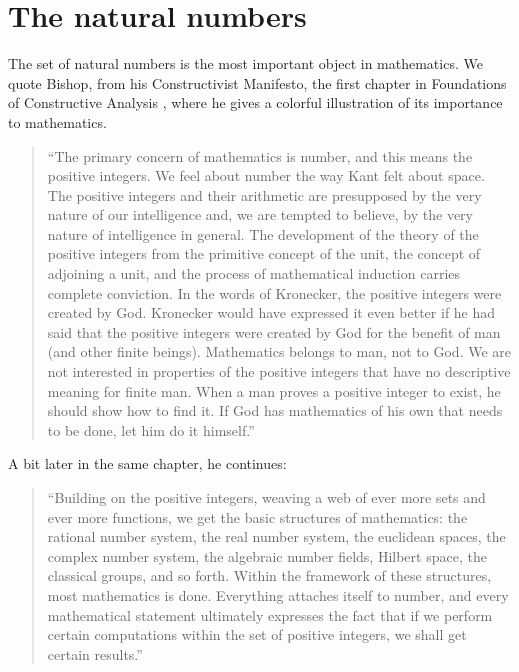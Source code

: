 \section{The natural numbers}
\label{sec:nat}


The set of natural numbers is the most important object in mathematics. We quote Bishop, from his Constructivist Manifesto, the first chapter in Foundations of Constructive Analysis \cite{Bishop1967}, where he gives a colorful illustration of its importance to mathematics.

\begin{quote}
  ``The primary concern of mathematics is number, and this means the positive integers. We feel about number the way Kant felt about space. The positive integers and their arithmetic are presupposed by the very nature of our intelligence and, we are tempted to believe, by the very nature of intelligence in general. The development of the theory of the positive integers from the primitive concept of the unit, the concept of adjoining a unit, and the process of mathematical induction carries complete conviction. In the words of Kronecker, the positive integers were created by God. Kronecker would have expressed it even better if he had said that the positive integers were created by God for the benefit of man (and other finite beings). Mathematics belongs to man, not to God. We are not interested in properties of the positive integers that have no descriptive meaning for finite man. When a man proves a positive integer to exist, he should show how to find it. If God has mathematics of his own that needs to be done, let him do it himself.''
\end{quote}

A bit later in the same chapter, he continues:

\begin{quote}
  ``Building on the positive integers, weaving a web of ever more sets and ever more functions, we get the basic structures of mathematics: the rational number system, the real number system, the euclidean spaces, the complex number system, the algebraic number fields, Hilbert space, the classical groups, and so forth. Within the framework of these structures, most mathematics is done. Everything attaches itself to number, and every mathematical statement ultimately expresses the fact that if we perform certain computations within the set of positive integers, we shall get certain results.''
\end{quote}

